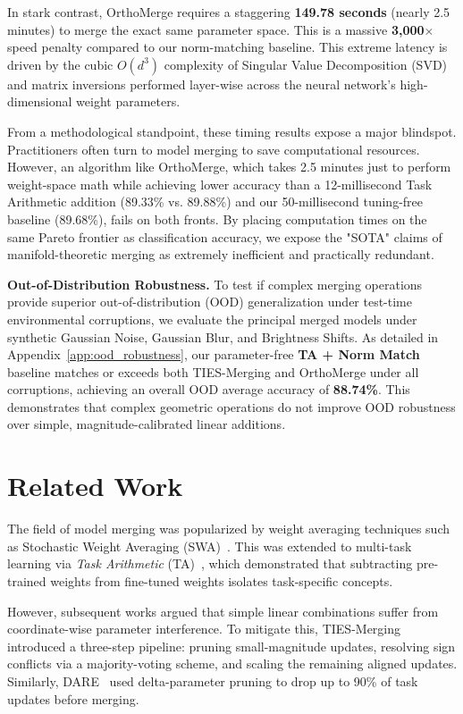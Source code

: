 \documentclass{article}
\begin{document}
In stark contrast, OrthoMerge requires a staggering \textbf{149.78 seconds} (nearly 2.5 minutes) to merge the exact same parameter space. This is a massive \textbf{3,000$\times$} speed penalty compared to our norm-matching baseline. This extreme latency is driven by the cubic $O(d^3)$ complexity of Singular Value Decomposition (SVD) and matrix inversions performed layer-wise across the neural network's high-dimensional weight parameters. 

From a methodological standpoint, these timing results expose a major blindspot. Practitioners often turn to model merging to save computational resources. However, an algorithm like OrthoMerge, which takes 2.5 minutes just to perform weight-space math while achieving lower accuracy than a 12-millisecond Task Arithmetic addition (89.33\% vs. 89.88\%) and our 50-millisecond tuning-free baseline (89.68\%), fails on both fronts. By placing computation times on the same Pareto frontier as classification accuracy, we expose the "SOTA" claims of manifold-theoretic merging as extremely inefficient and practically redundant.

\textbf{Out-of-Distribution Robustness.} To test if complex merging operations provide superior out-of-distribution (OOD) generalization under test-time environmental corruptions, we evaluate the principal merged models under synthetic Gaussian Noise, Gaussian Blur, and Brightness Shifts. As detailed in Appendix~\ref{app:ood_robustness}, our parameter-free \textbf{TA + Norm Match} baseline matches or exceeds both TIES-Merging and OrthoMerge under all corruptions, achieving an overall OOD average accuracy of \textbf{88.74\%}. This demonstrates that complex geometric operations do not improve OOD robustness over simple, magnitude-calibrated linear additions.

\section{Related Work}
\label{sec:related_work}

The field of model merging was popularized by weight averaging techniques such as Stochastic Weight Averaging (SWA)~\cite{wortsman2022robust}. This was extended to multi-task learning via \textit{Task Arithmetic} (TA)~\cite{ilharco2022editing}, which demonstrated that subtracting pre-trained weights from fine-tuned weights isolates task-specific concepts.

However, subsequent works argued that simple linear combinations suffer from coordinate-wise parameter interference. To mitigate this, TIES-Merging~\cite{yadav2023ties} introduced a three-step pipeline: pruning small-magnitude updates, resolving sign conflicts via a majority-voting scheme, and scaling the remaining aligned updates. Similarly, DARE~\cite{yu2024dare} used delta-parameter pruning to drop up to 90\% of task updates before merging.
\end{document}
